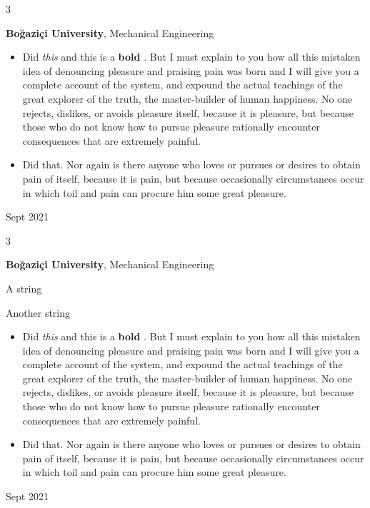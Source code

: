 \documentclass[10pt, letterpaper]{article}
\newenvironment{summary}{
    \begin{description}[
        topsep=0.10 cm,
        parsep=0.10 cm,
        partopsep=0pt,
        itemsep=0pt,
        leftmargin=0.4 cm + 10pt
    ]
}{
    \end{description}
} %
\newenvironment{highlights}{
    \begin{itemize}[
        topsep=0.10 cm,
        parsep=0.10 cm,
        partopsep=0pt,
        itemsep=0pt,
        leftmargin=0.4 cm + 10pt
    ]
}{
    \end{itemize}
} %
\newenvironment{threecolentry}[3][]{
    \onecolentry
    \def\thirdColumn{#3}
    \setcolumnwidth{1 cm, \fill, 4.5 cm}
    \begin{paracol}{3}
    {\raggedright #2} \switchcolumn
}{
    \switchcolumn \raggedleft \thirdColumn
    \end{paracol}
    \endonecolentry
} %
\let\hrefWithoutArrow\href
\renewcommand{\href}[2]{\hrefWithoutArrow{#1}{\ifthenelse{\equal{#2}{}}{ }{#2 }\raisebox{.15ex}{\footnotesize \faExternalLink*}}}
\begin{document}
        \vspace{0.2 cm}

        \begin{threecolentry}{\textbf{}}{
            Sept 2021
        }
            \textbf{Boğaziçi University}, Mechanical Engineering
            \begin{highlights}
                \item Did \textit{this} and this is a \textbf{bold} \href{https://example.com}{link}. But I must explain to you how all this mistaken idea of denouncing pleasure and praising pain was born and I will give you a complete account of the system, and expound the actual teachings of the great explorer of the truth, the master-builder of human happiness. No one rejects, dislikes, or avoids pleasure itself, because it is pleasure, but because those who do not know how to pursue pleasure rationally encounter consequences that are extremely painful.
                \item Did that. Nor again is there anyone who loves or pursues or desires to obtain pain of itself, because it is pain, but because occasionally circumstances occur in which toil and pain can procure him some great pleasure.
            \end{highlights}
        \end{threecolentry}

        \vspace{0.2 cm}

        \begin{threecolentry}{\textbf{}}{
            Sept 2021
        }
            \textbf{Boğaziçi University}, Mechanical Engineering
            \begin{summary}
                \item A string
                \item Another string
            \end{summary}
            \begin{highlights}
                \item Did \textit{this} and this is a \textbf{bold} \href{https://example.com}{link}. But I must explain to you how all this mistaken idea of denouncing pleasure and praising pain was born and I will give you a complete account of the system, and expound the actual teachings of the great explorer of the truth, the master-builder of human happiness. No one rejects, dislikes, or avoids pleasure itself, because it is pleasure, but because those who do not know how to pursue pleasure rationally encounter consequences that are extremely painful.
                \item Did that. Nor again is there anyone who loves or pursues or desires to obtain pain of itself, because it is pain, but because occasionally circumstances occur in which toil and pain can procure him some great pleasure.
            \end{highlights}
        \end{threecolentry}
\end{document}
